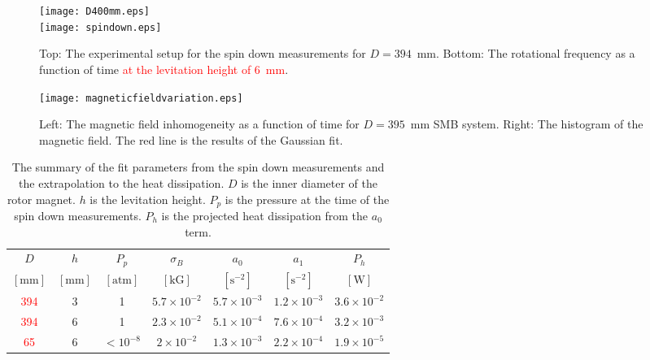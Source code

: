 \documentclass[journal]{IEEEtran}
\def\cred{\textcolor{red}}
\begin{document}
\begin{figure}[htb]
   \centering
   \texttt{[image: D400mm.eps]} \\
   \vspace{3mm}
   \texttt{[image: spindown.eps]}
   \caption{Top: The experimental setup for the spin down measurements for $D=394$~mm. Bottom: The rotational frequency as a function of time \cred{at the levitation height of 6~mm}.}
   \label{fig:spindown}
\end{figure}

\begin{figure}[htb]
   \centering
   \texttt{[image: magneticfieldvariation.eps]} %
   \caption{Left: The magnetic field inhomogeneity as a function of time for $D=395$~mm SMB system. Right: The histogram of the magnetic field. The red line is the results of the Gaussian fit. }
   \label{fig:Bval}
\end{figure}


\begin{table*}[t]
   \centering
   \begin{tabular}{c|c|c|c|c|c|c} %
	    $D$ & $h$& $P_p$ & $\sigma_B$ &$a_0$ & $a_1$  & $P_h$\\
	     $[\mbox{mm}]$ & $[\mbox{mm}]$ & $[\mbox{atm}]$ & $[\mbox{kG}]$ & $[\mbox{s}^{-2}]$  & $[\mbox{s}^{-2}]$  & $[\mbox{W}]$ \\ \hline
        \cred{394} & 3  & 1  & $5.7\times10^{-2}$ & $5.7\times10^{-3}$  & $1.2\times10^{-3}$ & $3.6\times10^{-2}$\\
	\cred{394} & 6  &  1 & $2.3\times10^{-2}$ & $5.1\times10^{-4}$ & $7.6\times10^{-4}$ & $3.2\times10^{-3}$\\
	\cred{65} & 6   &  $<10^{-8}$ & $2\times10^{-2}$ & $1.3\times10^{-3}$ & $2.2\times10^{-4}$ & $1.9\times10^{-5}$
   \end{tabular}
   \caption{The summary of the fit parameters from the spin down measurements and the extrapolation to the heat dissipation.
     $D$ is the inner diameter of the rotor magnet.
     $h$ is the levitation height.
     $P_p$ is the pressure at the time of the spin down measurements.
     $P_h$ is the projected heat dissipation from the $a_0$ term.}

   \label{tab:fitpar}
\end{table*}
\end{document}
